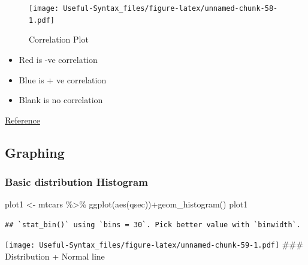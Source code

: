 \documentclass[
]{article}
\newenvironment{Shaded}{\begin{snugshade}}{\end{snugshade}}
\newcommand{\FunctionTok}[1]{\textcolor[rgb]{0.00,0.00,0.00}{#1}}
\newcommand{\NormalTok}[1]{#1}
\newcommand{\OtherTok}[1]{\textcolor[rgb]{0.56,0.35,0.01}{#1}}
\newcommand{\SpecialCharTok}[1]{\textcolor[rgb]{0.00,0.00,0.00}{#1}}
\providecommand{\tightlist}{%
  \setlength{\itemsep}{0pt}\setlength{\parskip}{0pt}}
\begin{document}
\begin{figure}
\centering
\texttt{[image: Useful-Syntax\_files/figure-latex/unnamed-chunk-58-1.pdf]}
\caption{\label{fig:unnamed-chunk-58}Correlation Plot}
\end{figure}

\begin{itemize}
\tightlist
\item
  Red is -ve correlation
\item
  Blue is + ve correlation
\item
  Blank is no correlation
\end{itemize}

\href{https://cran.r-project.org/web/packages/corrplot/vignettes/corrplot-intro.html}{Reference}

\hypertarget{graphing}{%
\subsection{Graphing}\label{graphing}}

\hypertarget{basic-distribution-histogram}{%
\subsubsection{Basic distribution Histogram}\label{basic-distribution-histogram}}

\begin{Shaded}
\begin{Highlighting}[]
\NormalTok{plot1 }\OtherTok{\textless{}{-}}\NormalTok{ mtcars }\SpecialCharTok{\%\textgreater{}\%} \FunctionTok{ggplot}\NormalTok{(}\FunctionTok{aes}\NormalTok{(qsec))}\SpecialCharTok{+}\FunctionTok{geom\_histogram}\NormalTok{()}
\NormalTok{plot1}
\end{Highlighting}
\end{Shaded}

\begin{verbatim}
## `stat_bin()` using `bins = 30`. Pick better value with `binwidth`.
\end{verbatim}

\texttt{[image: Useful-Syntax\_files/figure-latex/unnamed-chunk-59-1.pdf]}
\#\#\# Distribution + Normal line
\end{document}
